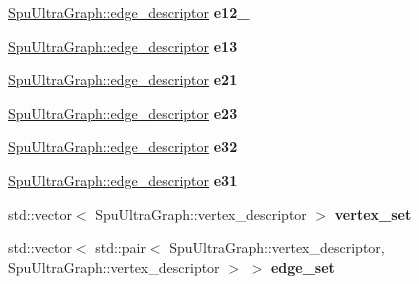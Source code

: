 \begin{DoxyCompactItemize}
\item 
\mbox{\label{struct_fixture_a26cbd640ca42b734a25d64033f19ef78}} 
\hyperlink{class_s_p_u___g_r_a_p_h_1_1_spu_ultra_graph_a5f3776e003ef0a1648f1d9f84289810b}{Spu\+Ultra\+Graph\+::edge\+\_\+descriptor} {\bfseries e12\+\_}
\item 
\mbox{\label{struct_fixture_a8add5ebbba1e293b961eb9fda0d141d0}} 
\hyperlink{class_s_p_u___g_r_a_p_h_1_1_spu_ultra_graph_a5f3776e003ef0a1648f1d9f84289810b}{Spu\+Ultra\+Graph\+::edge\+\_\+descriptor} {\bfseries e13}
\item 
\mbox{\label{struct_fixture_a8bdd66984d5e0f2085c33f22ee25962f}} 
\hyperlink{class_s_p_u___g_r_a_p_h_1_1_spu_ultra_graph_a5f3776e003ef0a1648f1d9f84289810b}{Spu\+Ultra\+Graph\+::edge\+\_\+descriptor} {\bfseries e21}
\item 
\mbox{\label{struct_fixture_a844fc9093ffa04a42186b22e1eebf4d9}} 
\hyperlink{class_s_p_u___g_r_a_p_h_1_1_spu_ultra_graph_a5f3776e003ef0a1648f1d9f84289810b}{Spu\+Ultra\+Graph\+::edge\+\_\+descriptor} {\bfseries e23}
\item 
\mbox{\label{struct_fixture_af3989905bdf5788da2828f27eee8e653}} 
\hyperlink{class_s_p_u___g_r_a_p_h_1_1_spu_ultra_graph_a5f3776e003ef0a1648f1d9f84289810b}{Spu\+Ultra\+Graph\+::edge\+\_\+descriptor} {\bfseries e32}
\item 
\mbox{\label{struct_fixture_a85d78773c6006be28ab68c513af0a047}} 
\hyperlink{class_s_p_u___g_r_a_p_h_1_1_spu_ultra_graph_a5f3776e003ef0a1648f1d9f84289810b}{Spu\+Ultra\+Graph\+::edge\+\_\+descriptor} {\bfseries e31}
\item 
\mbox{\label{struct_fixture_a79c126342e64fca24e3307dce537528a}} 
std\+::vector$<$ Spu\+Ultra\+Graph\+::vertex\+\_\+descriptor $>$ {\bfseries vertex\+\_\+set}
\item 
\mbox{\label{struct_fixture_a543c399291942551c43dce0ffa4b7b6c}} 
std\+::vector$<$ std\+::pair$<$ Spu\+Ultra\+Graph\+::vertex\+\_\+descriptor, Spu\+Ultra\+Graph\+::vertex\+\_\+descriptor $>$ $>$ {\bfseries edge\+\_\+set}
\item 
\mbox{\label{struct_fixture_abf9e07dce04da1900ca9b9652d0c4f18}} 

\end{DoxyCompactItemize}
